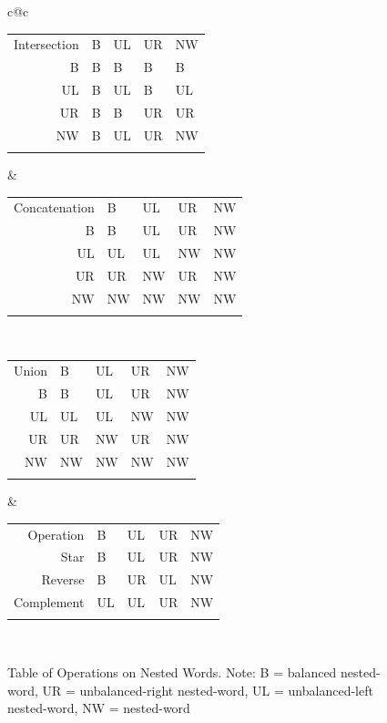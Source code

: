 \documentclass{llncs}
\begin{document}
\begin{figure}[htb]
  \centering
\begin{tabular}{c@{\hspace{1cm}}c}
  \begin{tabular}{|| r || l | l | l | l ||}
\hhline{|t:=====:t|}
    Intersection & B & UL & UR & NW \\
\hhline{||=#=|=|=|=||}
    B & B & B & B & B \\
\hhline{||-||-|-|-|-||}
    UL & B & UL & B & UL \\
 \hhline{||-||-|-|-|-||}
    UR & B & B & UR & UR \\
\hhline{||-||-|-|-|-||}
    NW & B & UL & UR & NW \\
\hhline{|b:=====:b|}
  \end{tabular}
\vspace{1cm} &
  \begin{tabular}{|| r || l | l | l | l ||}
\hhline{|t:=====:t|}
    Concatenation & B & UL & UR & NW \\
\hhline{||=#=|=|=|=||}
    B & B & UL & UR & NW \\
\hhline{||-||-|-|-|-||}
    UL & UL & UL & NW & NW \\
\hhline{||-||-|-|-|-||}
    UR & UR & NW & UR & NW \\
\hhline{||-||-|-|-|-||}
    NW & NW & NW & NW & NW \\
\hhline{|b:=====:b|}
  \end{tabular} \\
\vspace{1cm}
  \begin{tabular}{|| r || l | l | l | l ||}
\hhline{|t:=====:t|}
    Union & B & UL & UR & NW \\
\hhline{||=#=|=|=|=||}
    B & B & UL & UR & NW \\
\hhline{||-||-|-|-|-||}
    UL & UL & UL & NW & NW \\
\hhline{||-||-|-|-|-||}
    UR & UR & NW & UR & NW \\
\hhline{||-||-|-|-|-||}
    NW & NW & NW & NW & NW \\
\hhline{|b:=====:b|}
  \end{tabular} &
  \begin{tabular}{|| r || l | l | l | l ||}
\hhline{|t:=====:t|}
    Operation & B & UL & UR & NW \\
\hhline{||=#=|=|=|=||}
    Star & B & UL & UR & NW \\
\hhline{||-||-|-|-|-||}
    Reverse & B & UR & UL & NW \\
\hhline{||-||-|-|-|-||}
    Complement & UL & UL & UR & NW \\
\hhline{|b:=====:b|}
  \end{tabular} \\
\end{tabular}
  \caption{Table of Operations on Nested Words. Note: B = balanced nested-word, UR = unbalanced-right nested-word, UL = unbalanced-left nested-word, NW = nested-word}
  \label{Fig:Ops}
\end{figure}
\end{document}

